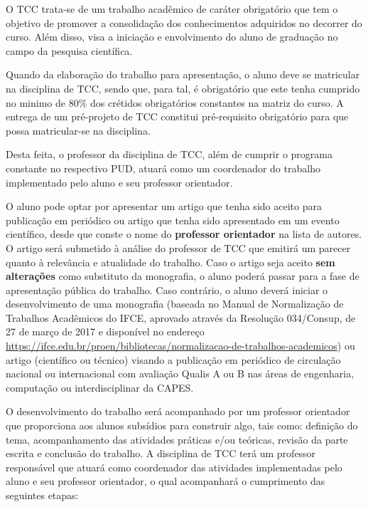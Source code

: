 \documentclass{paper}
\def\web#1{\href{#1}{#1}}
\begin{document}
O TCC trata-se de um trabalho acadêmico de caráter obrigatório que tem o objetivo de promover a consolidação dos conhecimentos adquiridos no decorrer do curso. Além disso, visa a iniciação e envolvimento do aluno de graduação no campo da pesquisa científica.

Quando da elaboração do trabalho para apresentação, o aluno deve se matricular na disciplina de TCC, sendo que, para tal, é obrigatório que este tenha cumprido no minimo de 80\% dos crétidos obrigatórios constantes na matriz do curso.  
A entrega de um pré-projeto de TCC constitui pré-requisito obrigatório para que possa matricular-se na disciplina. 

Desta feita, o professor da disciplina de TCC, além de cumprir o programa constante no respectivo PUD, atuará como um coordenador do trabalho implementado pelo aluno e seu professor orientador.

O aluno pode optar por apresentar um artigo que tenha sido aceito para publicação em periódico ou artigo que tenha sido apresentado em um evento científico, desde que conste o nome do \textbf{professor orientador} na lista de autores. O artigo será submetido à análise do professor de TCC que emitirá um parecer quanto à relevância e atualidade do trabalho. Caso o artigo seja aceito \textbf{sem alterações} como substituto da monografia, o aluno poderá passar para a fase de apresentação pública do trabalho. Caso contrário, o aluno deverá iniciar o desenvolvimento de uma monografia (baseada no Manual de Normalização de Trabalhos Acadêmicos do IFCE, aprovado através da Resolução 034/Consup, de 27 de março de 2017 e disponível no endereço \web{https://ifce.edu.br/proen/bibliotecas/normalizacao-de-trabalhos-academicos}) ou artigo (científico ou técnico) visando a publicação em periódico de circulação nacional ou internacional com avaliação Qualis A ou B nas áreas de engenharia, computação ou interdisciplinar da CAPES.

O desenvolvimento do trabalho será acompanhado por um professor orientador que proporciona aos alunos subsídios para construir algo, tais como: definição do tema, acompanhamento das atividades práticas e/ou teóricas, revisão da parte escrita e conclusão do trabalho. A disciplina de TCC terá um professor responsável que atuará como coordenador das atividades implementadas pelo aluno e seu professor orientador, o qual acompanhará o cumprimento das seguintes etapas:
\end{document}
